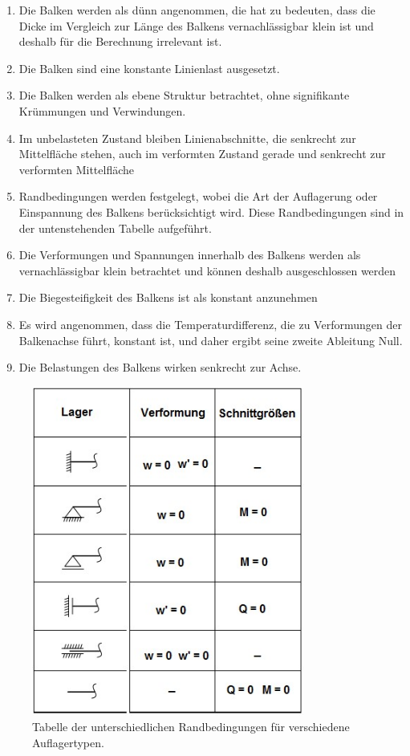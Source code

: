 \begin{enumerate}
	\item Die Balken werden als dünn angenommen, die hat zu bedeuten, dass die Dicke im Vergleich zur Länge des Balkens vernachlässigbar klein ist und deshalb für die Berechnung irrelevant ist.
	\item Die Balken sind eine konstante Linienlast ausgesetzt.
	\item Die Balken werden als ebene Struktur betrachtet, ohne signifikante Krümmungen und Verwindungen.
	\item Im unbelasteten Zustand bleiben Linienabschnitte, die senkrecht zur Mittelfläche stehen, auch im verformten Zustand gerade und senkrecht zur verformten Mittelfläche
	\item Randbedingungen werden festgelegt, wobei die Art der Auflagerung oder Einspannung des Balkens berücksichtigt wird.
	Diese Randbedingungen sind in der untenstehenden Tabelle aufgeführt.
	\item Die Verformungen und Spannungen innerhalb des Balkens werden als vernachlässigbar klein betrachtet und können deshalb ausgeschlossen werden
	\item Die Biegesteifigkeit des Balkens ist als konstant anzunehmen
	\item Es wird angenommen, dass die Temperaturdifferenz, die zu Verformungen der Balkenachse führt, konstant ist, und daher ergibt seine zweite Ableitung Null.
	\item Die Belastungen des Balkens wirken senkrecht zur Achse.
\end{enumerate}
\begin{figure}
\begin{center}
	\includegraphics[width=0.8\textwidth]{papers/balken/images/teil2/Randbedingungen.jpg}
\end{center}
\caption{Tabelle der unterschiedlichen Randbedingungen für verschiedene Auflagertypen.}
\end{figure}
